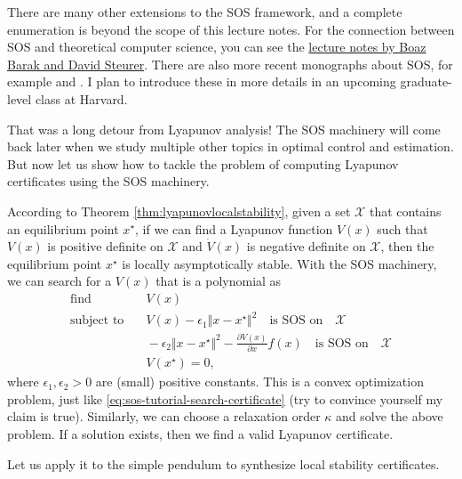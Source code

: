 \documentclass[
]{book}
\theoremstyle{definition}
\theoremstyle{definition}
\theoremstyle{definition}
\theoremstyle{definition}
\theoremstyle{remark}
\begin{document}
There are many other extensions to the SOS framework, and a complete enumeration is beyond the scope of this lecture notes. For the connection between SOS and theoretical computer science, you can see the \href{https://www.sumofsquares.org/public/index.html}{lecture notes by Boaz Barak and David Steurer}. There are also more recent monographs about SOS, for example \citep{magron23book-sparse} and \citep{nie23book-moment}. I plan to introduce these in more details in an upcoming graduate-level class at Harvard.

That was a long detour from Lyapunov analysis! The SOS machinery will come back later when we study multiple other topics in optimal control and estimation. But now let us show how to tackle the problem of computing Lyapunov certificates using the SOS machinery.

According to Theorem \ref{thm:lyapunovlocalstability}, given a set \(\mathcal{X}\) that contains an equilibrium point \(x^\star\), if we can find a Lyapunov function \(V(x)\) such that \(V(x)\) is positive definite on \(\mathcal{X}\) and \(\dot{V}(x)\) is negative definite on \(\mathcal{X}\), then the equilibrium point \(x^\star\) is locally asymptotically stable. With the SOS machinery, we can search for a \(V(x)\) that is a polynomial as
\begin{align}
\text{find} & \quad V(x) \\
\text{subject to} & \quad V(x) - \epsilon_1 \Vert x - x^\star \Vert^2 \quad \text{is SOS on} \quad \mathcal{X} \\
& \quad - \epsilon_2 \Vert x - x^\star \Vert^2 - \frac{\partial V(x)}{\partial x} f(x) \quad \text{is SOS on} \quad \mathcal{X} \\
& \quad V(x^\star) = 0,
\end{align}
where \(\epsilon_1, \epsilon_2 > 0\) are (small) positive constants. This is a convex optimization problem, just like \eqref{eq:sos-tutorial-search-certificate} (try to convince yourself my claim is true). Similarly, we can choose a relaxation order \(\kappa\) and solve the above problem. If a solution exists, then we find a valid Lyapunov certificate.

Let us apply it to the simple pendulum to synthesize local stability certificates.
\end{document}
